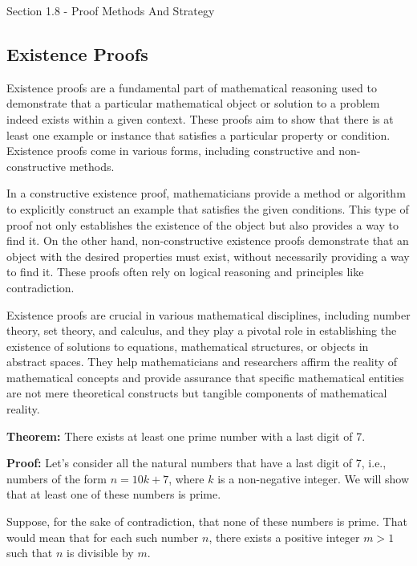 \begin{notes}{Section 1.8 - Proof Methods And Strategy}
    \subsection*{Existence Proofs}

    Existence proofs are a fundamental part of mathematical reasoning used to demonstrate that a particular mathematical object or solution to a problem indeed exists within a given context. These proofs aim to show 
    that there is at least one example or instance that satisfies a particular property or condition. Existence proofs come in various forms, including constructive and non-constructive methods.

    In a constructive existence proof, mathematicians provide a method or algorithm to explicitly construct an example that satisfies the given conditions. This type of proof not only establishes the existence of the 
    object but also provides a way to find it. On the other hand, non-constructive existence proofs demonstrate that an object with the desired properties must exist, without necessarily providing a way to find it. These 
    proofs often rely on logical reasoning and principles like contradiction.

    Existence proofs are crucial in various mathematical disciplines, including number theory, set theory, and calculus, and they play a pivotal role in establishing the existence of solutions to equations, mathematical 
    structures, or objects in abstract spaces. They help mathematicians and researchers affirm the reality of mathematical concepts and provide assurance that specific mathematical entities are not mere theoretical constructs 
    but tangible components of mathematical reality.

    \begin{Highlight}
        \textbf{Theorem:} There exists at least one prime number with a last digit of 7. \vspace*{1em}
    
    
        \textbf{Proof:} Let's consider all the natural numbers that have a last digit of 7, i.e., numbers of the form \(n = 10k + 7\), where \(k\) is a non-negative integer. We will show that at least one of these 
        numbers is prime.
    
        Suppose, for the sake of contradiction, that none of these numbers is prime. That would mean that for each such number \(n\), there exists a positive integer \(m > 1\) such that \(n\) is divisible by \(m\). 
    

\end{Highlight}
\end{notes}
